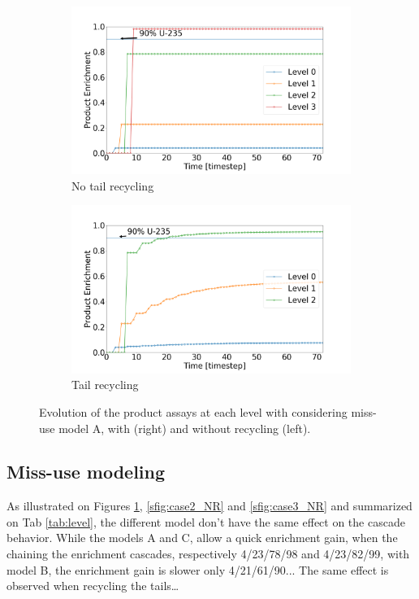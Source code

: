 \begin{figure}[h!]
    \centering
    \begin{subfigure}[t]{0.45\textwidth}
        \centering
        \includegraphics[scale=0.18]{NR_case1}
        \caption{No tail recycling}
        \label{sfig:case1_NR}
    \end{subfigure}%
    \begin{subfigure}[t]{0.45\textwidth}
        \centering
        \includegraphics[scale=0.18]{R_case1}
        \caption{Tail recycling}
        \label{sfig:case1_R}
    \end{subfigure}
    \caption{Evolution of the product assays at each level with considering
    miss-use model A, with (right) and without recycling (left).}
    \label{fig:case1}
\end{figure}

\subsection{Miss-use modeling}
As illustrated on Figures \ref{sfig:case1_NR}, \ref{sfig:case2_NR} and
\ref{sfig:case3_NR} and summarized on Tab \ref{tab:level}, the different model
don't have the same effect on the cascade behavior. While the models A and C,
allow a quick enrichment gain, when the chaining the enrichment cascades, respectively
4/23/78/98 and 4/23/82/99, with model B, the enrichment gain is slower only
4/21/61/90...
The same effect is observed when recycling the tails\ldots

